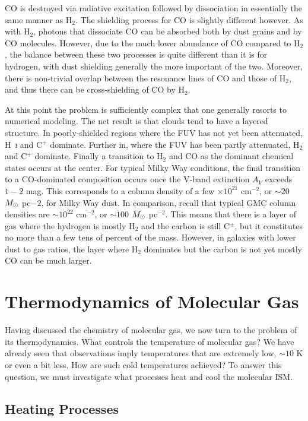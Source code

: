 CO is destroyed via radiative excitation followed by dissociation in essentially the same manner as H$_2$. The shielding process for CO is slightly different however. As with H$_2$, photons that dissociate CO can be absorbed both by dust grains and by CO molecules. However, due to the much lower abundance of CO compared to H$_2$, the balance between these two processes is quite different than it is for hydrogen, with dust shielding generally the more important of the two. Moreover, there is non-trivial overlap between the resonance lines of CO and those of H$_2$, and thus there can be cross-shielding of CO by H$_2$.

At this point the problem is sufficiently complex that one generally resorts to numerical modeling. The net result is that clouds tend to have a layered structure. In poorly-shielded regions where the FUV has not yet been attenuated, H~\textsc{i} and C$^+$ dominate. Further in, where the FUV has been partly attenuated, H$_2$ and C$^+$ dominate. Finally a transition to H$_2$ and CO as the dominant chemical states occurs at the center. For typical Milky Way conditions, the final transition to a CO-dominated composition occurs once the V-band extinction $A_V$ exceeds $1-2$ mag. This corresponds to a column density of a few $\times 10^{21}$ cm$^{-2}$, or $\sim 20$ $M_{\odot}$ pc${-2}$, for Milky Way dust. In comparison, recall that typical GMC column densities are $\sim 10^{22}$ cm$^{-2}$, or $\sim 100$ $M_{\odot}$ pc$^{-2}$. This means that there is a layer of gas where the hydrogen is mostly H$_2$ and the carbon is still C$^+$, but it constitutes no more than a few tens of percent of the mass. However, in galaxies with lower dust to gas ratios, the layer where H$_2$ dominates but the carbon is not yet mostly CO can be much larger.

\section{Thermodynamics of Molecular Gas}

Having discussed the chemistry of molecular gas, we now turn to the problem of its thermodynamics. What controls the temperature of molecular gas? We have already seen that observations imply temperatures that are extremely low, $\sim 10$ K or even a bit less. How are such cold temperatures achieved? To answer this question, we must investigate what processes heat and cool the molecular ISM.

\subsection{Heating Processes}
\label{ssec:heatproc}

